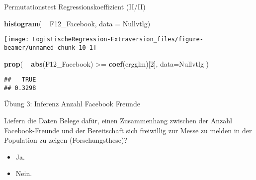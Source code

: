 \documentclass[ignorenonframetext,]{beamer}
\newenvironment{Shaded}{\begin{snugshade}}{\end{snugshade}}
\newcommand{\KeywordTok}[1]{\textcolor[rgb]{0.13,0.29,0.53}{\textbf{{#1}}}}
\newcommand{\DataTypeTok}[1]{\textcolor[rgb]{0.13,0.29,0.53}{{#1}}}
\newcommand{\DecValTok}[1]{\textcolor[rgb]{0.00,0.00,0.81}{{#1}}}
\newcommand{\StringTok}[1]{\textcolor[rgb]{0.31,0.60,0.02}{{#1}}}
\newcommand{\NormalTok}[1]{{#1}}
\providecommand{\tightlist}{%
  \setlength{\itemsep}{0pt}\setlength{\parskip}{0pt}}
\begin{document}
\begin{frame}[fragile]{Permutationstest Regressionskoeffizient (II/II)}

\begin{Shaded}
\begin{Highlighting}[]
\KeywordTok{histogram}\NormalTok{( ~}\StringTok{ }\NormalTok{F12_Facebook, }\DataTypeTok{data =} \NormalTok{Nullvtlg)}
\end{Highlighting}
\end{Shaded}

\begin{center}\texttt{[image: LogistischeRegression-Extraversion\_files/figure-beamer/unnamed-chunk-10-1]} \end{center}

\begin{Shaded}
\begin{Highlighting}[]
\KeywordTok{prop}\NormalTok{( ~}\StringTok{ }\KeywordTok{abs}\NormalTok{(F12_Facebook) >=}\StringTok{ }\KeywordTok{coef}\NormalTok{(ergglm)[}\DecValTok{2}\NormalTok{], }
      \DataTypeTok{data=}\NormalTok{Nullvtlg )}
\end{Highlighting}
\end{Shaded}

\begin{verbatim}
##   TRUE 
## 0.3298
\end{verbatim}

\end{frame}

\begin{frame}{Übung 3: Inferenz Anzahl Facebook Freunde}

Liefern die Daten Belege dafür, einen Zusammenhang zwischen der Anzahl
Facebook-Freunde und der Bereitschaft sich freiwillig zur Messe zu
melden in der Population zu zeigen (Forschungsthese)?

\begin{itemize}
\tightlist
\item
  Ja.
\item
  Nein.
\end{itemize}

\end{frame}
\end{document}
